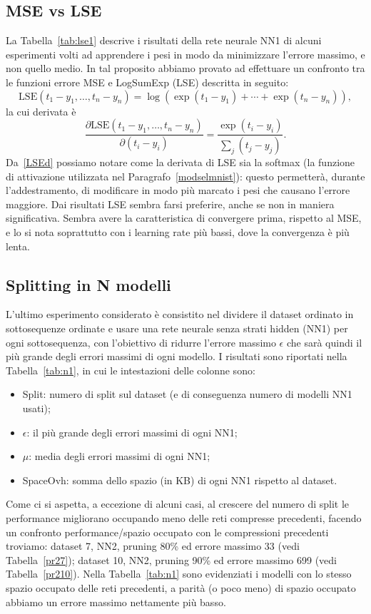 \documentclass[11pt,a4paper,twoside,
openright]{book}
\begin{document}
\subsection{MSE vs LSE}
\label{seclse}
La Tabella~\ref{tab:lse1} descrive i risultati della rete neurale NN1 di alcuni esperimenti volti ad apprendere i pesi in modo da minimizzare l'errore massimo, e non quello medio. In tal proposito abbiamo provato ad effettuare un confronto tra le funzioni errore MSE e LogSumExp (LSE) descritta in seguito:
\begin{equation}
\mathrm{LSE}(t_1-y_1,\dots ,t_n-y_n)=\log \left(\exp(t_1-y_1)+\cdots +\exp(t_n-y_n)\right),
\label{LSE}
\end{equation}
la cui derivata è
\begin{equation}
\frac{\partial \mathrm{LSE}(t_1-y_1,\dots ,t_n-y_n)}{\partial (t_i-y_i)} = \frac{\exp{(t_i-y_i)}}{\sum\limits_j (t_j-y_j)}.
\label{LSEd}
\end{equation}
Da~\eqref{LSEd} possiamo notare come la derivata di LSE sia la softmax (la funzione di attivazione utilizzata nel Paragrafo~\ref{modselmnist}): questo permetterà, durante l'addestramento, di modificare in modo più marcato i pesi che causano l'errore maggiore.
Dai risultati LSE sembra farsi preferire, anche se non in maniera significativa. Sembra avere la caratteristica di convergere prima, rispetto al MSE, e lo si nota soprattutto con i learning rate più bassi, dove la convergenza è più lenta.


\subsection{Splitting in N modelli}
L'ultimo esperimento considerato è consistito nel dividere il dataset ordinato in sottosequenze ordinate e usare una rete neurale senza strati hidden (NN1) per ogni sottosequenza, con l'obiettivo di ridurre l'errore massimo $\epsilon$ che sarà quindi il più grande degli errori massimi di ogni modello.
I risultati sono riportati nella Tabella~\ref{tab:n1}, in cui le intestazioni delle colonne sono:
\begin{itemize}
		\item Split: numero di split sul dataset (e di conseguenza numero di modelli NN1 usati);
		\item $\epsilon$: il più grande degli errori massimi di ogni NN1;
		\item $\mu$: media degli errori massimi di ogni NN1;
		\item SpaceOvh: somma dello spazio (in KB) di ogni NN1 rispetto al dataset.
	\end{itemize}
Come ci si aspetta, a eccezione di alcuni casi, al crescere del numero di split le performance migliorano occupando meno delle reti compresse precedenti, facendo un confronto performance/spazio occupato con le compressioni precedenti troviamo: dataset 7, NN2, pruning 80\% ed errore massimo 33 (vedi Tabella~\ref{pr27}); dataset 10, NN2, pruning 90\% ed errore massimo 699 (vedi Tabella~\ref{pr210}). Nella Tabella~\ref{tab:n1} sono evidenziati i modelli con lo stesso spazio occupato delle reti precedenti, a parità (o poco meno) di spazio occupato abbiamo un errore massimo nettamente più basso.
\end{document}
